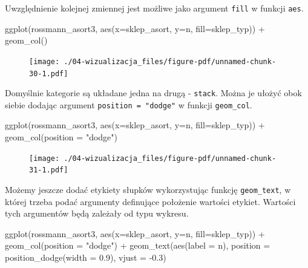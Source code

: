 \documentclass[
  letterpaper,
  DIV=11,
  numbers=noendperiod]{scrreprt}
\newenvironment{Shaded}{\begin{snugshade}}{\end{snugshade}}
\newcommand{\AttributeTok}[1]{\textcolor[rgb]{0.40,0.45,0.13}{#1}}
\newcommand{\FloatTok}[1]{\textcolor[rgb]{0.68,0.00,0.00}{#1}}
\newcommand{\FunctionTok}[1]{\textcolor[rgb]{0.28,0.35,0.67}{#1}}
\newcommand{\NormalTok}[1]{\textcolor[rgb]{0.00,0.23,0.31}{#1}}
\newcommand{\SpecialCharTok}[1]{\textcolor[rgb]{0.37,0.37,0.37}{#1}}
\newcommand{\StringTok}[1]{\textcolor[rgb]{0.13,0.47,0.30}{#1}}
\begin{document}
Uwzględnienie kolejnej zmiennej jest możliwe jako argument \texttt{fill}
w funkcji \texttt{aes}.

\begin{Shaded}
\begin{Highlighting}[]
\FunctionTok{ggplot}\NormalTok{(rossmann\_asort3, }\FunctionTok{aes}\NormalTok{(}\AttributeTok{x=}\NormalTok{sklep\_asort, }\AttributeTok{y=}\NormalTok{n, }\AttributeTok{fill=}\NormalTok{sklep\_typ)) }\SpecialCharTok{+}
  \FunctionTok{geom\_col}\NormalTok{()}
\end{Highlighting}
\end{Shaded}

\begin{figure}[H]

{\centering \texttt{[image: ./04-wizualizacja\_files/figure-pdf/unnamed-chunk-30-1.pdf]}

}

\end{figure}

Domyślnie kategorie są układane jedna na drugą - \texttt{stack}. Można
je ułożyć obok siebie dodając argument \texttt{position\ =\ "dodge"} w
funkcji \texttt{geom\_col}.

\begin{Shaded}
\begin{Highlighting}[]
\FunctionTok{ggplot}\NormalTok{(rossmann\_asort3, }\FunctionTok{aes}\NormalTok{(}\AttributeTok{x=}\NormalTok{sklep\_asort, }\AttributeTok{y=}\NormalTok{n, }\AttributeTok{fill=}\NormalTok{sklep\_typ)) }\SpecialCharTok{+}
  \FunctionTok{geom\_col}\NormalTok{(}\AttributeTok{position =} \StringTok{"dodge"}\NormalTok{)}
\end{Highlighting}
\end{Shaded}

\begin{figure}[H]

{\centering \texttt{[image: ./04-wizualizacja\_files/figure-pdf/unnamed-chunk-31-1.pdf]}

}

\end{figure}

Możemy jeszcze dodać etykiety słupków wykorzystując funkcję
\texttt{geom\_text}, w której trzeba podać argumenty definujące
położenie wartości etykiet. Wartości tych argumentów będą zależały od
typu wykresu.

\begin{Shaded}
\begin{Highlighting}[]
\FunctionTok{ggplot}\NormalTok{(rossmann\_asort3, }\FunctionTok{aes}\NormalTok{(}\AttributeTok{x=}\NormalTok{sklep\_asort, }\AttributeTok{y=}\NormalTok{n, }\AttributeTok{fill=}\NormalTok{sklep\_typ)) }\SpecialCharTok{+}
  \FunctionTok{geom\_col}\NormalTok{(}\AttributeTok{position =} \StringTok{"dodge"}\NormalTok{) }\SpecialCharTok{+} 
  \FunctionTok{geom\_text}\NormalTok{(}\FunctionTok{aes}\NormalTok{(}\AttributeTok{label =}\NormalTok{ n), }
            \AttributeTok{position =} \FunctionTok{position\_dodge}\NormalTok{(}\AttributeTok{width =} \FloatTok{0.9}\NormalTok{),}
            \AttributeTok{vjust =} \SpecialCharTok{{-}}\FloatTok{0.3}\NormalTok{)}
\end{Highlighting}
\end{Shaded}
\end{document}
